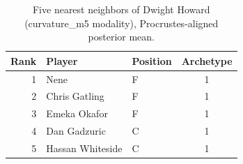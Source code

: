 \begin{table}[htbp]
  \centering\small
  \begin{tabular}{rllc}
    \toprule
    Rank & Player & Position & Archetype \\
    \midrule
    1 & Nene & F & 1 \\
    2 & Chris Gatling & F & 1 \\
    3 & Emeka Okafor & F & 1 \\
    4 & Dan Gadzuric & C & 1 \\
    5 & Hassan Whiteside & C & 1 \\
    \bottomrule
  \end{tabular}
  \caption{Five nearest neighbors of Dwight Howard (curvature_m5 modality), Procrustes-aligned posterior mean.}
  \label{tab:Dwight_Howard_neighbors_curvature_m5}
\end{table}

